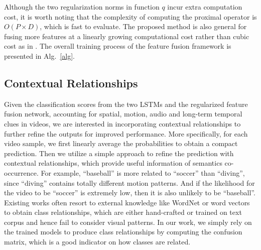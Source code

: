 \documentclass[journal]{IEEEtran}
\begin{document}
Although the two regularization norms in function $q$ incur extra computation cost, it is worth noting that the complexity of computing the proximal operator is $O(P \times D)$, which is fast to evaluate. The proposed method is also general for fusing more features at a linearly growing computational cost rather than cubic cost as in \cite{TPAMI-fcvid}. The overall training process of the feature fusion framework is presented in Alg.~\ref{alg}.



\subsection{Contextual Relationships}
Given the classification scores from the two LSTMs and the regularized feature fusion network, accounting for spatial, motion, audio and long-term temporal clues in videos, we are interested in incorporating contextual relationships to further refine the outputs for improved performance. More specifically, for each video sample, we first linearly average the probabilities to obtain a compact prediction. Then we utilize a simple approach to refine the prediction with contextual relationships, which provide useful information of semantics co-occurrence. For example, ``baseball'' is more related to ``soccer'' than ``diving'', since ``diving'' contains totally different motion patterns. And if the likelihood for the video to be ``soccer'' is extremely low, then it is also unlikely to be ``baseball''. Existing works often resort to external knowledge like WordNet or word vectors to obtain class relationships, which are either hand-crafted or trained on text corpus and hence fail to consider visual patterns. In our work, we simply rely on the trained models to produce class relationships by computing the confusion matrix, which is a good indicator on how classes are related. 
\end{document}

